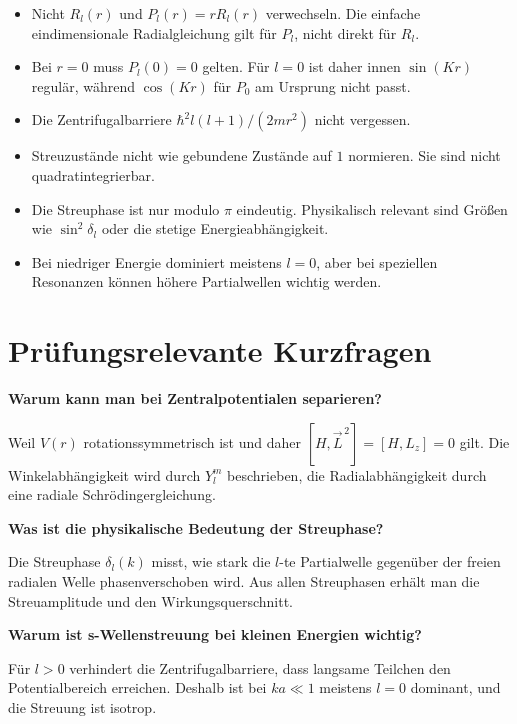 \begin{warningbox}
\begin{itemize}
    \item Nicht \(R_l(r)\) und \(P_l(r)=rR_l(r)\) verwechseln. Die einfache eindimensionale Radialgleichung gilt für \(P_l\), nicht direkt für \(R_l\).
    \item Bei \(r=0\) muss \(P_l(0)=0\) gelten. Für \(l=0\) ist daher innen \(\sin(Kr)\) regulär, während \(\cos(Kr)\) für \(P_0\) am Ursprung nicht passt.
    \item Die Zentrifugalbarriere \(\hbar^2l(l+1)/(2mr^2)\) nicht vergessen.
    \item Streuzustände nicht wie gebundene Zustände auf \(1\) normieren. Sie sind nicht quadratintegrierbar.
    \item Die Streuphase ist nur modulo \(\pi\) eindeutig. Physikalisch relevant sind Größen wie \(\sin^2\delta_l\) oder die stetige Energieabhängigkeit.
    \item Bei niedriger Energie dominiert meistens \(l=0\), aber bei speziellen Resonanzen können höhere Partialwellen wichtig werden.
\end{itemize}
\end{warningbox}

\section{Prüfungsrelevante Kurzfragen}

\begin{examtipbox}
\textbf{Warum kann man bei Zentralpotentialen separieren?}

Weil \(V(r)\) rotationssymmetrisch ist und daher \([H,\vec L^{\,2}]=[H,L_z]=0\) gilt. Die Winkelabhängigkeit wird durch \(Y_l^m\) beschrieben, die Radialabhängigkeit durch eine radiale Schrödingergleichung.
\end{examtipbox}

\begin{examtipbox}
\textbf{Was ist die physikalische Bedeutung der Streuphase?}

Die Streuphase \(\delta_l(k)\) misst, wie stark die \(l\)-te Partialwelle gegenüber der freien radialen Welle phasenverschoben wird. Aus allen Streuphasen erhält man die Streuamplitude und den Wirkungsquerschnitt.
\end{examtipbox}

\begin{examtipbox}
\textbf{Warum ist s-Wellenstreuung bei kleinen Energien wichtig?}

Für \(l>0\) verhindert die Zentrifugalbarriere, dass langsame Teilchen den Potentialbereich erreichen. Deshalb ist bei \(ka\ll1\) meistens \(l=0\) dominant, und die Streuung ist isotrop.
\end{examtipbox}

